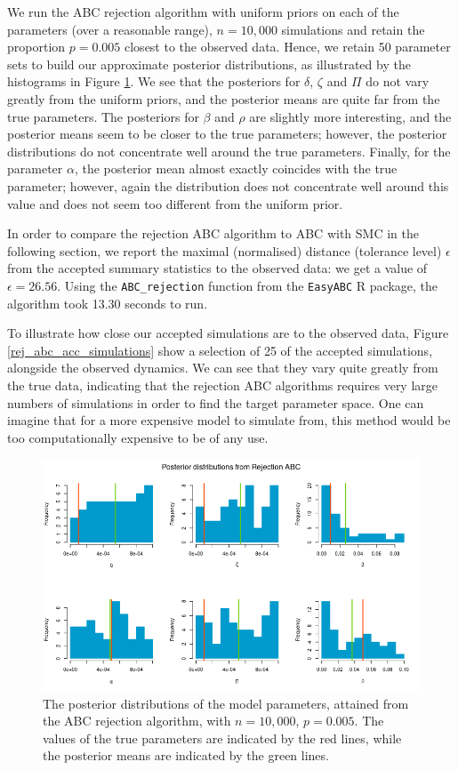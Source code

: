 \documentclass[]{article}
\begin{document}
We run the ABC rejection algorithm with uniform priors on each of the parameters (over a reasonable range), $n=10,000$ simulations and retain the proportion $p=0.005$ closest to the observed data. Hence, we retain 50 parameter sets to build our approximate posterior distributions, as illustrated by the histograms in Figure \ref{rej_abc_posteriors}. We see that the posteriors for $\delta$, $\zeta$ and $\Pi$ do not vary greatly from the uniform priors, and the posterior means are quite far from the true parameters. The posteriors for $\beta$ and $\rho$ are slightly more interesting, and the posterior means seem to be closer to the true parameters; however, the posterior distributions do not concentrate well around the true parameters. Finally, for the parameter $\alpha$, the posterior mean almost exactly coincides with the true parameter; however, again the distribution does not concentrate well around this value and does not seem too different from the uniform prior.

In order to compare the rejection ABC algorithm to ABC with SMC in the following section, we report the maximal (normalised) distance (tolerance level) $\epsilon$ from the accepted summary statistics to the observed data: we get a value of $\epsilon = 26.56$. Using the \texttt{ABC\_rejection} function from the \texttt{EasyABC} R package, the algorithm took 13.30 seconds to run. 

To illustrate how close our accepted simulations are to the observed data, Figure \ref{rej_abc_acc_simulations} show a selection of 25 of the accepted simulations, alongside the observed dynamics. We can see that they vary quite greatly from the true data, indicating that the rejection ABC algorithms requires very large numbers of simulations in order to find the target parameter space. One can imagine that for a more expensive model to simulate from, this method would be too computationally expensive to be of any use.


\begin{figure}[H]
	\centering
	\includegraphics[width=1\linewidth]{../Figures/rejection_posteriors}
	\caption{The posterior distributions of the model parameters, attained from the ABC rejection algorithm, with $n=10,000$, $p=0.005$. The values of the true parameters are indicated by the red lines, while the posterior means are indicated by the green lines.}
	\label{rej_abc_posteriors}
\end{figure}
\end{document}
